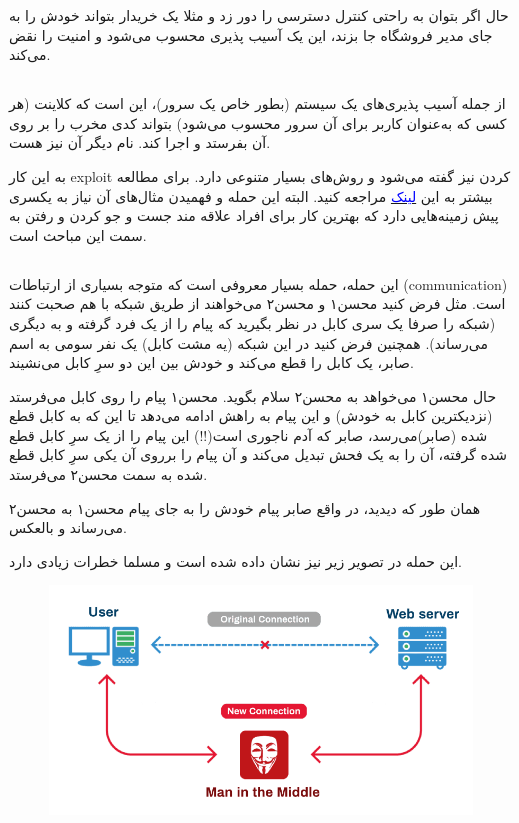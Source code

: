 \documentclass[]{article}
\begin{document}
حال اگر بتوان به راحتی کنترل دسترسی را دور زد و مثلا یک خریدار بتواند خودش را به جای مدیر فروشگاه جا بزند، این یک آسیب پذیری محسوب می‌شود و امنیت را نقض می‌کند.


\subsection*{{}}
از جمله آسیب پذیری‌های یک سیستم (‌بطور خاص یک سرور)، این است که کلاینت (هر کسی که به‌عنوان کاربر برای آن سرور محسوب می‌شود) بتواند کدی مخرب را بر روی آن بفرستد و اجرا کند. نام دیگر آن  نیز هست.



به این کار exploit کردن نیز گفته می‌شود و روش‌های بسیار متنوعی دارد. برای مطالعه بیشتر به این \href{https://owasp.org/www-community/attacks/Code_Injection}{\textcolor{blue}{لینک}}  مراجعه کنید. البته این حمله و فهمیدن مثال‌‌های آن نیاز به یکسری پیش زمینه‌هایی دارد که بهترین کار برای افراد علاقه مند جست و جو کردن و رفتن به سمت این مباحث است. 



\subsection*{{}}
این حمله، حمله بسیار معروفی است که متوجه بسیاری از ارتباطات (‌communication) است. مثل فرض کنید محسن۱ و محسن۲  می‌خواهند از طریق شبکه با هم صحبت کنند (شبکه را صرفا یک سری کابل در نظر بگیرید که پیام را از یک فرد گرفته و به دیگری می‌رساند). همچنین فرض کنید در این شبکه (یه مشت کابل)‌ یک نفر سومی به اسم صابر، یک کابل را قطع می‌‌کند و خودش بین این دو سرِ کابل می‌نشیند.

\bigskip

حال محسن۱ می‌خواهد به محسن۲ سلام بگوید. محسن۱ پیام را روی کابل می‌فرستد (نزدیکترین کابل به خودش) و این پیام به راهش ادامه می‌دهد تا این که به کابل قطع شده (صابر)‌می‌رسد، صابر که آدم ناجوری است(!!) این پیام را از یک سرِ کابل قطع شده گرفته، آن را به یک فحش تبدیل می‌کند و آن پیام را برروی آن یکی سرِ کابل قطع شده به سمت محسن۲ می‌فرستد.

همان طور که دیدید، در واقع صابر پیام خودش را به جای پیام محسن۱ به محسن۲ می‌رساند و بالعکس.

\bigskip
این حمله در تصویر زیر نیز نشان داده شده است و مسلما خطرات زیادی دارد.

\begin{figure}
  \includegraphics[width=\linewidth]{images/man-in-the-middle.png}
\end{figure}
\bigskip
\end{document}
